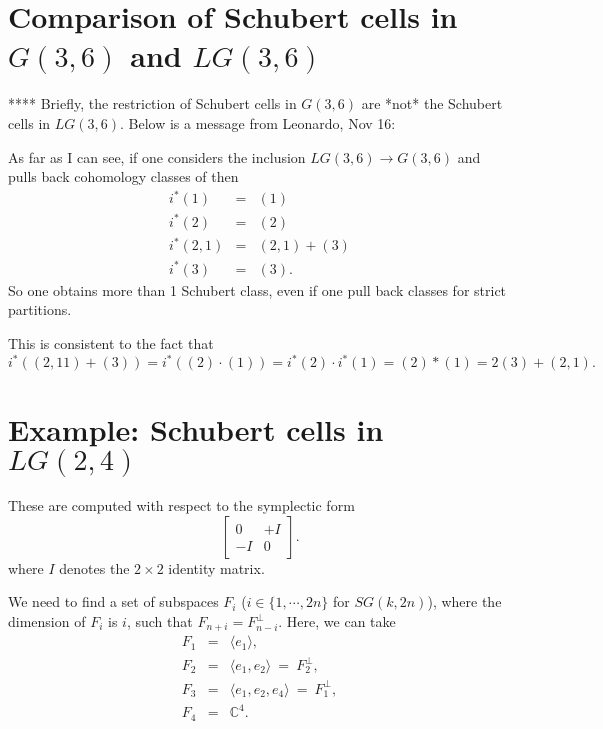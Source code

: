 \documentclass[12pt]{article}
\begin{document}
\appendix


\section{Comparison of Schubert cells in $G(3,6)$ and $LG(3,6)$}

**** Briefly, the restriction of Schubert cells in $G(3,6)$ are *not*
the Schubert cells in $LG(3,6)$.  Below is a message from Leonardo, Nov 16:

As far as I can see, if one considers the inclusion 
$LG(3,6) \rightarrow  G(3,6)$
and pulls back cohomology classes of then
\begin{eqnarray}
i^*(1) & = & (1)
\\
i^*(2) & = & (2)
\\
i^*(2,1) & = & (2,1) + (3)
\\
i^*(3) & = & (3).
\end{eqnarray}
So one obtains more than 1 Schubert class, even if one pull back classes for strict partitions.

This is consistent to the fact that
\begin{equation}
i^*((2,11) +(3)) = i^*((2) \cdot (1)) = i^*(2) \cdot i^*(1) = (2) * (1) 
= 2 (3) + (2,1).
\end{equation}

\section{Example: Schubert cells in $LG(2,4)$}

These are computed with respect to the symplectic form
\begin{equation}
\left[ \begin{array}{cc}
0 & +I \\ -I & 0 \end{array} \right].
\end{equation}
where $I$ denotes the $2 \times 2$ identity matrix.

We need to find a set of subspaces $F_i$ ($i \in \{1, \cdots, 2n\}$ for
$SG(k,2n)$), where the dimension of $F_i$ is $i$,
such that $F_{n+i} = F_{n-i}^{\perp}$.
Here, we can take
\begin{eqnarray}
F_1 & = & \langle e_1 \rangle,
\\
F_2 & = & \langle e_1, e_2 \rangle \: = \: F_2^{\perp},
\\
F_3 & = & \langle e_1, e_2, e_4 \rangle \: = \: F_1^{\perp},
\\
F_4 & = & {\mathbb C}^4.
\end{eqnarray}
\end{document}
